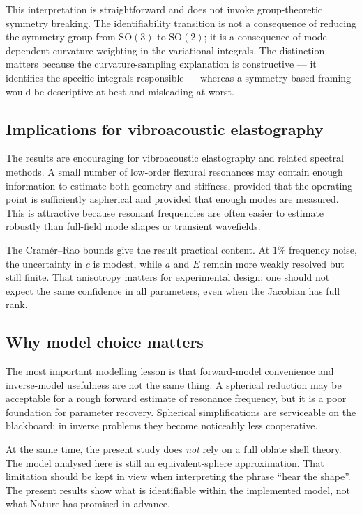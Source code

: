 This interpretation is straightforward and does not invoke group-theoretic
symmetry breaking.  The identifiability transition is not a consequence of
reducing the symmetry group from $\mathrm{SO}(3)$ to $\mathrm{SO}(2)$; it is a
consequence of mode-dependent curvature weighting in the variational
integrals.  The distinction matters because the curvature-sampling explanation
is constructive --- it identifies the specific integrals responsible --- whereas
a symmetry-based framing would be descriptive at best and misleading at worst.

\subsection{Implications for vibroacoustic elastography}

The results are encouraging for vibroacoustic elastography and related spectral
methods.  A small number of low-order flexural resonances may contain enough
information to estimate both geometry and stiffness, provided that the operating
point is sufficiently aspherical and provided that enough modes are measured.
This is attractive because resonant frequencies are often easier to estimate
robustly than full-field mode shapes or transient wavefields.

The Cram\'er--Rao bounds give the result practical content.  At $1\%$ frequency
noise, the uncertainty in $c$ is modest, while $a$ and $E$ remain more weakly
resolved but still finite.  That anisotropy matters for experimental design:
one should not expect the same confidence in all parameters, even when the
Jacobian has full rank.

\subsection{Why model choice matters}

The most important modelling lesson is that forward-model convenience and
inverse-model usefulness are not the same thing.  A spherical reduction may be
acceptable for a rough forward estimate of resonance frequency, but it is a poor
foundation for parameter recovery.  Spherical simplifications are serviceable on
the blackboard; in inverse problems they become noticeably less cooperative.

At the same time, the present study does \emph{not} rely on a full oblate shell
theory.  The model analysed here is still an equivalent-sphere approximation.
That limitation should be kept in view when interpreting the phrase ``hear the
shape''.  The present results show what is identifiable within the implemented
model, not what Nature has promised in advance.

